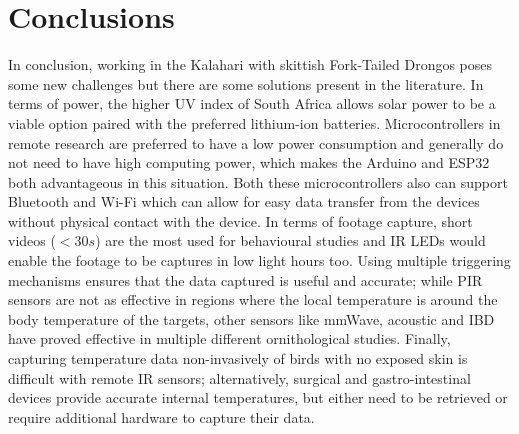 \documentclass[class=report,11pt,crop=false]{standalone}
\begin{document}
\chapter{Conclusions \label{ch:conclusions}}

In conclusion, working in the Kalahari with skittish Fork-Tailed Drongos poses some new challenges but there are some solutions present in the literature. In terms of power, the higher UV index of South Africa \cite{SA_UV_Index} allows solar power to be a viable option paired with the preferred lithium-ion batteries. Microcontrollers in remote research are preferred to have a low power consumption and generally do not need to have high computing power, which makes the Arduino and ESP32 both advantageous in this situation. Both these microcontrollers also can support Bluetooth and Wi-Fi which can allow for easy data transfer from the devices without physical contact with the device. In terms of footage capture, short videos ($<30s$) are the most used for behavioural studies and \acrlong{IR} \acrshort{LEDs} would enable the footage to be captures in low light hours too. Using multiple triggering mechanisms ensures that the data captured is useful and accurate; while \acrshort{PIR} sensors are not as effective in regions where the local temperature is around the body temperature of the targets, other sensors like \acrshort{mmWave}, acoustic and \acrshort{IBD} have proved effective in multiple different ornithological studies. Finally, 
capturing temperature data non-invasively of birds with no exposed skin is difficult with remote 
\acrshort{IR} sensors; alternatively, surgical and gastro-intestinal devices provide accurate internal temperatures, but either need to be retrieved or require additional hardware to capture their data. 

\ifstandalone

\printnoidxglossary[type=\acronymtype,nonumberlist]
\fi
\end{document}
